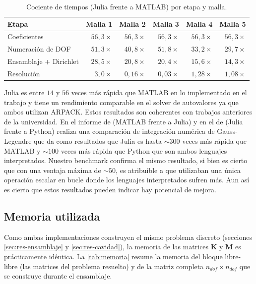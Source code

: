 \documentclass[12pt]{report} %
\begin{document}
\begin{table}[htbp]
	\centering
	\caption{Cociente de tiempos (Julia frente a MATLAB) por etapa y malla.}
	\label{tab:tiempos-todas}
	\begin{tabular}{lrrrrr}
		\toprule
		\textbf{Etapa} & \textbf{Malla 1} & \textbf{Malla 2} & \textbf{Malla 3} & \textbf{Malla 4} & \textbf{Malla 5} \\
		\midrule
		Coeficientes & $56{,}3\times$ & $56{,}3\times$ & $56{,}3\times$ & $56{,}3\times$ & $56{,}3\times$ \\
		Numeración de DOF & $51{,}3\times$ & $40{,}8\times$ & $51{,}8\times$ & $33{,}2\times$ & $29{,}7\times$ \\
		Ensamblaje + Dirichlet & $28{,}5\times$ & $20{,}8\times$ & $20{,}4\times$ & $15{,}6\times$ & $14{,}3\times$ \\
		Resolución & $3{,}0\times$ & $0{,}16\times$ & $0{,}03\times$ & $1{,}28\times$ & $1{,}08\times$ \\
		\bottomrule
	\end{tabular}
\end{table}

Julia es entre $14$ y $56$ veces más rápida que MATLAB en lo implementado en el trabajo y tiene un rendimiento comparable en el solver de autovalores ya que ambos utilizan ARPACK. Estos resultados son coherentes con trabajos anteriores de la universidad. En el informe de \cite{nunez2023julia} (MATLAB frente a Julia) y en el de \cite{mohedano2023julia} (Julia frente a Python) realiza una comparación de integración numérica de Gauss-Legendre que da como resultados que Julia es hasta $\sim300$ veces más rápida que MATLAB y $\sim100$ veces más rápida que Python que son ambos lenguajes interpretados. Nuestro benchmark confirma el mismo resultado, si bien es cierto que con una ventaja máxima de $\sim50$, es atribuible a que utilizaban una única operación escalar en bucle donde los lenguajes interpretados sufren más. Aun así es cierto que estos resultados pueden indicar hay potencial de mejora.



\subsection{Memoria utilizada}\label{sec:res-memoria}
Como ambas implementaciones construyen el mismo problema discreto (secciones \ref{sec:res-ensamblaje} y \ref{sec:res-cavidad}), la memoria de las matrices $\mathbf{K}$ y $\mathbf{M}$ es prácticamente idéntica. La \autoref{tab:memoria} resume la memoria del bloque libre-libre (las matrices del problema resuelto) y de la matriz completa $n_{dof}\times n_{dof}$ que se construye durante el ensamblaje.
\end{document}
